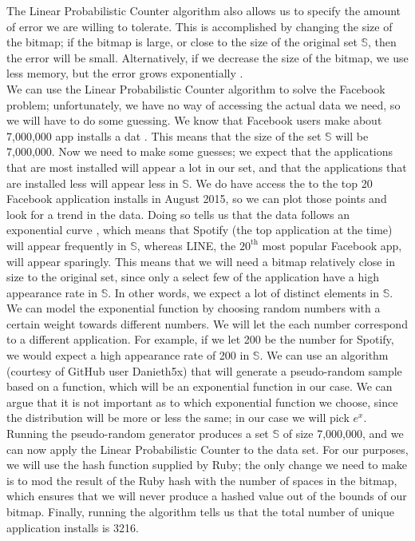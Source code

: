 \documentclass{article}
\begin{document}
\noindent The Linear Probabilistic Counter algorithm also allows us to specify the amount of error we are willing to tolerate.
This is accomplished by changing the size of the bitmap; if the bitmap is large, or close to the size of the original set $\mathbb{S}$, then the error will be small.
Alternatively, if we decrease the size of the bitmap, we use less memory, but the error grows exponentially \cite{Hoff}.\\
\indent We can use the Linear Probabilistic Counter algorithm to solve the Facebook problem; unfortunately, we have no way of accessing the actual data we need, so we will have to do some guessing. 
We know that Facebook users make about 7,000,000 app installs a dat \cite{Facebook-2}.
This means that the size of the set $\mathbb{S}$ will be 7,000,000.
Now we need to make some guesses; we expect that the applications that are most installed will appear a lot in our set, and that the applications that are installed less will appear less in $\mathbb{S}$. 
We do have access the to the top 20 Facebook application installs in August 2015, so we can plot those points and look for a trend in the data.
Doing so tells us that the data follows an exponential curve \cite{Facebook-2}, which means that Spotify (the top application at the time) will appear frequently in $\mathbb{S}$, whereas LINE, the $20^{\text{th}}$ most popular Facebook app, will appear sparingly.
This means that we will need a bitmap relatively close in size to the original set, since only a select few of the application have a high appearance rate in $\mathbb{S}$.
In other words, we expect a lot of distinct elements in $\mathbb{S}$.\\
\indent We can model the exponential function by choosing random numbers with a certain weight towards different numbers.
We will let the each number correspond to a different application.
For example, if we let 200 be the number for Spotify, we would expect a high appearance rate of 200 in $\mathbb{S}$.
We can use an algorithm (courtesy of GitHub user Danieth5x) that will generate a pseudo-random sample based on a function, which will be an exponential function in our case.
We can argue that it is not important as to which exponential function we choose, since the distribution will be more or less the same; in our case we will pick $e^{x}$.
Running the pseudo-random generator produces a set $\mathbb{S}$ of size 7,000,000, and we can now apply the Linear Probabilistic Counter to the data set.
For our purposes, we will use the hash function supplied by Ruby; the only change we need to make is to mod the result of the Ruby hash with the number of spaces in the bitmap, which ensures that we will never produce a  hashed value out of the bounds of our bitmap.
Finally, running the algorithm tells us that the total number of unique application installs is 3216.\\
\end{document}
